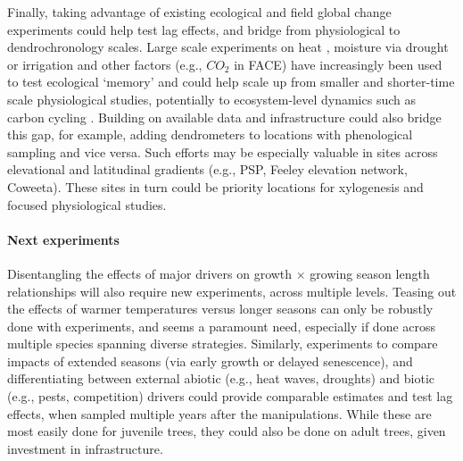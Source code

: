 \documentclass[11pt]{article}
\begin{document}
Finally, taking advantage of existing ecological and field global change experiments could help test lag effects, and bridge from physiological to dendrochronology scales. Large scale experiments on heat \citep[e.g., SPRUCE,][]{hanson2017attaining}, moisture via drought or irrigation \citep[e.g., DroughtNet, Phynwald][]{smith2016drought} and other factors (e.g., $CO_2$ in FACE) have increasingly been used to test ecological `memory' \citep[e.g., ][]{flinker2021promise, schweiger2022transgenerational} and could help scale up from smaller and shorter-time scale physiological studies, potentially to ecosystem-level dynamics such as carbon cycling \citep{ding2021plant, jensen2019simulated}. Building on available data and infrastructure could also bridge this gap, for example, adding dendrometers to locations with phenological sampling and vice versa. Such efforts may be especially valuable in sites across elevational and latitudinal gradients (e.g., PSP, Feeley elevation network, Coweeta). These sites in turn could be priority locations for xylogenesis and focused physiological studies. 

\paragraph{Next experiments}

Disentangling the effects of major drivers on growth $\times$ growing season length relationships will also require new experiments, across multiple levels. Teasing out the effects of warmer temperatures versus longer seasons can only be robustly done with experiments, and seems a paramount need, especially if done across multiple species spanning diverse strategies. Similarly, experiments to compare impacts of extended seasons (via early growth or delayed senescence), and differentiating between external abiotic (e.g., heat waves, droughts) and biotic (e.g., pests, competition) drivers could provide comparable estimates and test lag effects, when sampled multiple years after the manipulations. While these are most easily done for juvenile trees, they could also be done on adult trees, given  investment in infrastructure. %
\end{document}
